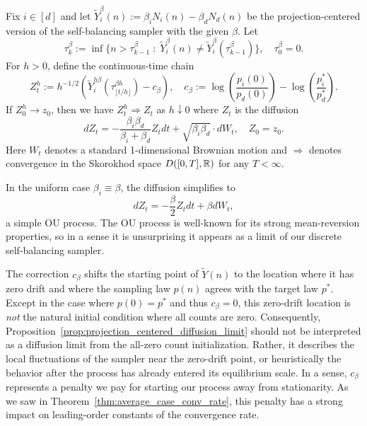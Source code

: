 \begin{proposition}\label{prop:projection_centered_diffusion_limit}

Fix $i \in [d]$ and let $\tilde{Y}_i^\beta(n) := \beta_iN_i(n) - \beta_dN_d(n)$ be the projection-centered version of the self-balancing sampler with the given $\beta$. Let
%
\[\tau^\beta_k := \inf \Big\{n > \tau^\beta_{k-1} \; : \; \tilde{Y}_i^\beta(n) \neq \tilde{Y}_i^\beta(\tau^\beta_{k-1}) \Big\}, \quad \tau_0^\beta = 0.\]
%
For $h > 0$, define the continuous-time chain
%
\[Z^h_t := h^{-1/2} \left(\tilde{Y}_i^{h\beta}(\tau^{\beta h}_{\lfloor t/h\rfloor}) - c_\beta\right), \quad c_\beta := \log\left(\frac{p_i(0)}{p_d(0)}\right) - \log\left(\frac{p^*_i}{p^*_d}\right).\]
%
\noindent If $Z_0^h \to z_0$, then we have $Z^h_t \Rightarrow Z_t$ as $h \downarrow 0$ where $Z_t$ is the diffusion
%
\[dZ_t = -\frac{\beta_i \beta_d}{\beta_i + \beta_d} Z_t dt + \sqrt{\beta_i\beta_d} \cdot dW_t, \quad Z_0 = z_0.\]
%
\noindent Here $W_t$ denotes a standard 1-dimensional Brownian motion and $\Rightarrow$ denotes convergence in the Skorokhod space $D([0,T], \mathbb{R})$ for any $T < \infty$.
\end{proposition}



In the uniform case $\beta_i \equiv \beta$, the diffusion simplifies to
%
\[dZ_t = -\frac{\beta}{2} Z_t dt + \beta dW_t,\]
%
\noindent a simple OU process. The OU process is well-known for its strong mean-reversion properties, so in a sense it is unsurprising it appears as a limit of our discrete self-balancing sampler.

The correction $c_\beta$ shifts the starting point of $\tilde{Y}(n)$ to the location
where it has zero drift and where the sampling law $p(n)$ agrees with the target law $p^*$.
Except in the case where $p(0) = p^*$ and thus $c_\beta = 0$, this zero-drift location is \textit{not} the natural
initial condition where all counts are zero. Consequently, Proposition~\ref{prop:projection_centered_diffusion_limit}
should not be interpreted as a diffusion limit from the all-zero count
initialization. Rather, it describes the local fluctuations of the sampler near
the zero-drift point, or heuristically the behavior after the process has already
entered its equilibrium scale. In a sense, $c_\beta$ represents a penalty we pay for starting our process
away from stationarity. As we saw in Theorem~\ref{thm:average_case_conv_rate}, this penalty has a strong
impact on leading-order constants of the convergence rate.


